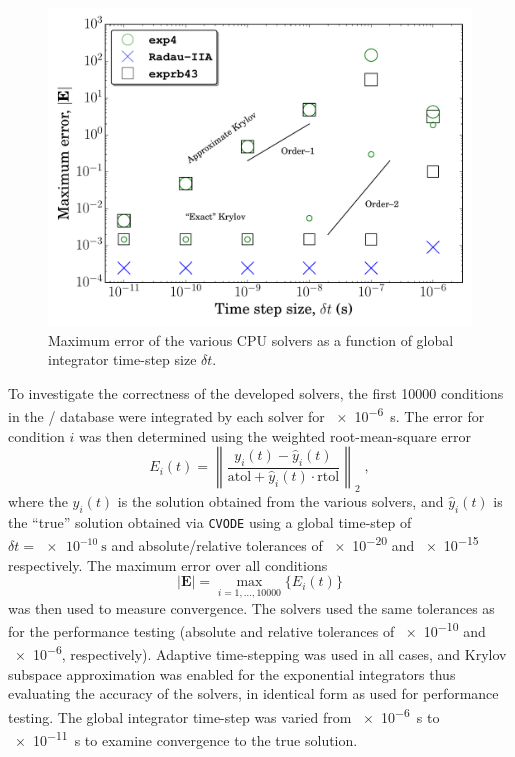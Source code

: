 \documentclass[preprint]{elsarticle}
\begin{document}
\begin{figure}[htb]
  \centering
  \includegraphics[width=0.7\linewidth]{c_nco_nosmem_error.pdf}
  \caption{Maximum error of the various CPU solvers as a function of global integrator time-step size $\delta t$.}
  \label{F:convergence}
\end{figure}

To investigate the correctness of the developed solvers, the first \num{10000} conditions in the \slash{} database were integrated by each solver for \SI{e-6}{\second}.
The error for condition $i$ was then determined using the weighted root-mean-square error
\begin{equation}
 E_i(t) = \left\lVert\frac{y_i(t) - \hat{y}_i(t)}{\text{atol} + \hat{y}_i(t) \cdot \text{rtol}}\right\rVert_2 \;,
\end{equation}
where the $y_i(t)$ is the solution obtained from the various solvers, and $\hat{y}_i(t)$ is the ``true'' solution obtained via \texttt{CVODE} using a global time-step of $\delta t = \SI{e-10}{\second}$ and absolute\slash relative tolerances of \num{e-20} and \num{e-15} respectively.
The maximum error over all conditions
\begin{equation}
 \left\lvert\textbf{E}\right\rvert = \max_{i= 1, \dots, \num{10000}}\{E_i(t)\}
\end{equation}
was then used to measure convergence.
The solvers used the same tolerances as for the performance testing (absolute and relative tolerances of \num{e-10} and \num{e-6}, respectively).
Adaptive time-stepping was used in all cases, and Krylov subspace approximation was enabled for the exponential integrators thus evaluating the accuracy of the solvers, in identical form as used for performance testing.
The global integrator time-step was varied from \SI{e-6}{\second} to \SI{e-11}{\second} to examine convergence to the true solution.
\end{document}
